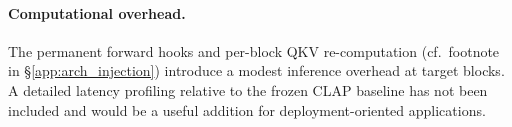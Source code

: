 \paragraph{Computational overhead.}

The permanent forward hooks and per-block QKV re-computation 
(cf.\ footnote in \S\ref{app:arch_injection}) introduce a modest 
inference overhead at target blocks. A detailed latency profiling 
relative to the frozen CLAP baseline has not been included and would 
be a useful addition for deployment-oriented applications.